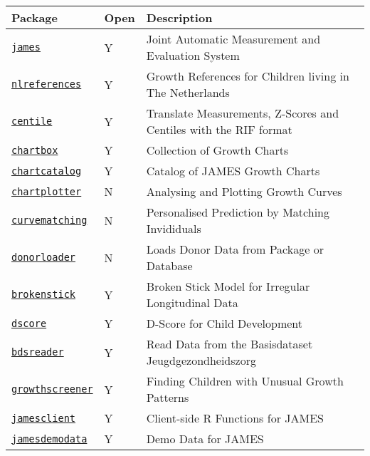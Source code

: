 \documentclass[
]{book}
\begin{document}
\begin{longtable}[]{@{}
  >{\raggedright\arraybackslash}p{}
  >{\raggedright\arraybackslash}p{}
  >{\raggedright\arraybackslash}p{}@{}}
\toprule
Package & Open & Description \\
\midrule
\endhead
\href{https://github.com/growthcharts/james}{\texttt{james}} & Y & Joint Automatic Measurement and Evaluation System \\
\href{https://github.com/growthcharts/nlreferences}{\texttt{nlreferences}} & Y & Growth References for Children living in The Netherlands \\
\href{https://github.com/growthcharts/centile}{\texttt{centile}} & Y & Translate Measurements, Z-Scores and Centiles with the RIF format \\
\href{https://github.com/growthcharts/chartbox}{\texttt{chartbox}} & Y & Collection of Growth Charts \\
\href{https://github.com/growthcharts/chartcatalog}{\texttt{chartcatalog}} & Y & Catalog of JAMES Growth Charts \\
\href{https://github.com/growthcharts/chartplotter}{\texttt{chartplotter}} & N & Analysing and Plotting Growth Curves \\
\href{https://github.com/growthcharts/curvematching}{\texttt{curvematching}} & N & Personalised Prediction by Matching Invididuals \\
\href{https://github.com/growthcharts/donorloader}{\texttt{donorloader}} & N & Loads Donor Data from Package or Database \\
\href{https://github.com/growthcharts/brokenstick}{\texttt{brokenstick}} & Y & Broken Stick Model for Irregular Longitudinal Data \\
\href{https://github.com/D-score/dscore}{\texttt{dscore}} & Y & D-Score for Child Development \\
\href{https://github.com/growthcharts/bdsreader}{\texttt{bdsreader}} & Y & Read Data from the Basisdataset Jeugdgezondheidszorg \\
\href{https://github.com/growthcharts/growthscreener}{\texttt{growthscreener}} & Y & Finding Children with Unusual Growth Patterns \\
\href{https://github.com/growthcharts/jamesclient}{\texttt{jamesclient}} & Y & Client-side R Functions for JAMES \\
\href{https://github.com/growthcharts/jamesdemodata}{\texttt{jamesdemodata}} & Y & Demo Data for JAMES \\
\bottomrule
\end{longtable}
\end{document}
